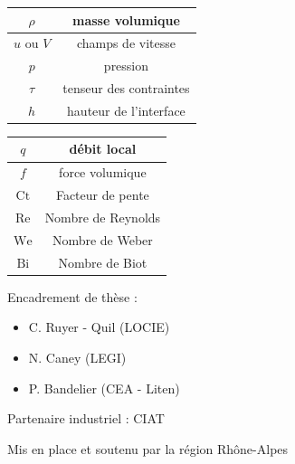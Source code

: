 \documentclass[a0,portrait]{a0poster}
\begin{document}
\begin{multicols}{2}
    \begin{center}
        \begin{tabular}{|c|c|}
            \hline $\rho$ & masse volumique \\
            \hline $u$ ou $V$ & champs de vitesse \\
            \hline $p$ & pression \\
            \hline $\tau$ & tenseur des contraintes \\
            \hline $h$ & hauteur de l'interface \\
            \hline
        \end{tabular}
        \begin{tabular}{|c|c|}
            \hline $q$ & débit local \\
            \hline $f$ & force volumique \\
            \hline $\mathrm{Ct}$ & Facteur de pente \\
            \hline $\mathrm{Re}$ & Nombre de Reynolds \\
            \hline $\mathrm{W\!e}$ & Nombre de Weber \\
            \hline $\mathrm{Bi}$ & Nombre de Biot \\
            \hline
        \end{tabular}
    \end{center}

        Encadrement de thèse :
        \begin{itemize}
            \item C. Ruyer - Quil (LOCIE)
            \item N. Caney (LEGI)
            \item P. Bandelier (CEA - Liten)
        \end{itemize}

        Partenaire industriel : CIAT

        Mis en place et soutenu par la région Rhône-Alpes
\end{multicols}
\end{document}
